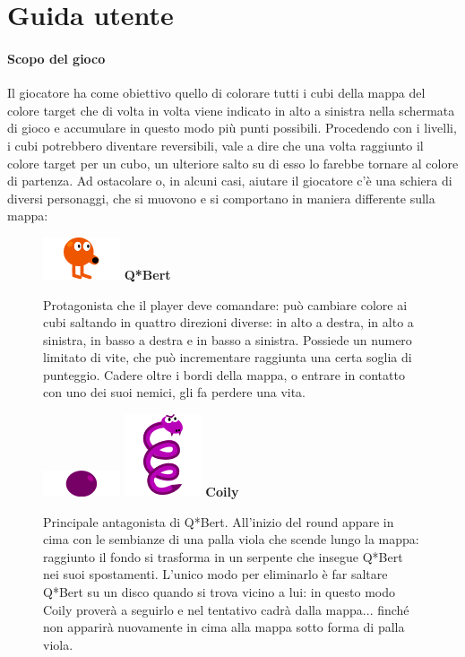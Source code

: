\documentclass[a4paper,12pt, hidelinks]{report}
\begin{document}
\appendix
\chapter{Guida utente}

\subsubsection{Scopo del gioco}

Il giocatore ha come obiettivo quello di colorare tutti i cubi della mappa del colore target che di volta in volta viene indicato in alto a sinistra nella schermata di gioco e accumulare in questo modo più punti possibili. Procedendo con i livelli, i cubi potrebbero diventare reversibili, vale a dire che una volta raggiunto il colore target per un cubo, un ulteriore salto su di esso lo farebbe tornare al colore di partenza. Ad ostacolare o, in alcuni casi, aiutare il giocatore c'è una schiera di diversi personaggi, che si muovono e si comportano in maniera differente sulla mappa:


\begin{figure}[H]
		\item
		\includegraphics[width=0.15\linewidth]{img/Qbert}
		\label{img:Q*Bert}
		\textbf{Q*Bert}
		
		Protagonista che il player deve comandare: può cambiare colore ai cubi saltando in quattro direzioni diverse: in alto a destra, in alto a sinistra, in basso a destra e in basso a sinistra. Possiede un numero limitato di vite, che può incrementare raggiunta una certa soglia di punteggio. Cadere oltre i bordi della mappa, o entrare in contatto con uno dei suoi nemici, gli fa perdere una vita.
			
\end{figure}

\begin{figure}[H]
		\item
		\includegraphics[width=0.15\linewidth]{img/PurpleBall}
		\includegraphics[width=0.15\linewidth]{img/Coily}
		\label{img:Coily}
		\textbf{Coily}
		
		Principale antagonista di Q*Bert. All'inizio del round appare in cima con le sembianze di una palla viola che scende lungo la mappa: raggiunto il fondo si trasforma in un serpente che insegue Q*Bert nei suoi spostamenti. L'unico modo per eliminarlo è far saltare Q*Bert su un disco quando si trova vicino a lui: in questo modo Coily proverà a seguirlo e nel tentativo cadrà dalla mappa... finché non apparirà nuovamente in cima alla mappa sotto forma di palla viola.
			
\end{figure}
\end{document}
